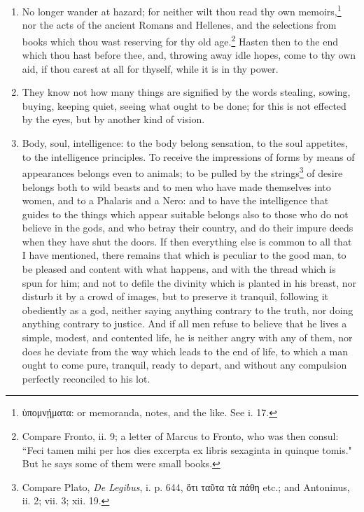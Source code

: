 \begin{enumerate}
\item No longer wander at hazard; for neither wilt thou read thy own memoirs,\footnote{\textgreek{ὑπομνῄματα}: or memoranda, notes, and the like. See i. 17.} nor the acts of the ancient Romans and Hellenes, and the selections from books which thou wast reserving for thy old age.\footnote{Compare Fronto, ii. 9; a letter of Marcus to Fronto, who was then consul: ``Feci tamen mihi per hos dies excerpta ex libris sexaginta in quinque tomis." But he says some of them were small books.} Hasten then to the end which thou hast before thee, and, throwing away idle hopes, come to thy own aid, if thou carest at all for thyself, while it is in thy power.

\item They know not how many things are signified by the words stealing, sowing, buying, keeping quiet, seeing what ought to be done; for this is not effected by the eyes, but by another kind of vision.

\item Body, soul, intelligence: to the body belong sensation, to the soul appetites, to the intelligence principles. To receive the impressions of forms by means of appearances belongs even to animals; to be pulled by the strings\footnote{Compare Plato, \textit{De Legibus}, i. p. 644, \textgreek{ὄτι ταῦτα τὰ πάθη} etc.; and Antoninus, ii. 2; vii. 3; xii. 19.} of desire belongs both to wild beasts and to men who have made themselves into women, and to a Phalaris and a Nero: and to have the intelligence that guides to the things which appear suitable belongs also to those who do not believe in the gods, and who betray their country, and do their impure deeds when they have shut the doors. If then everything else is common to all that I have mentioned, there remains that which is peculiar to the good man, to be pleased and content with what happens, and with the thread which is spun for him; and not to defile the divinity which is planted in his breast, nor disturb it by a crowd of images, but to preserve it tranquil, following it obediently as a god, neither saying anything contrary to the truth, nor doing anything contrary to justice. And if all men refuse to believe that he lives a simple, modest, and contented life, he is neither angry with any of them, nor does he deviate from the way which leads to the end of life, to which a man ought to come pure, tranquil, ready to depart, and without any compulsion perfectly reconciled to his lot.
\end{enumerate}
